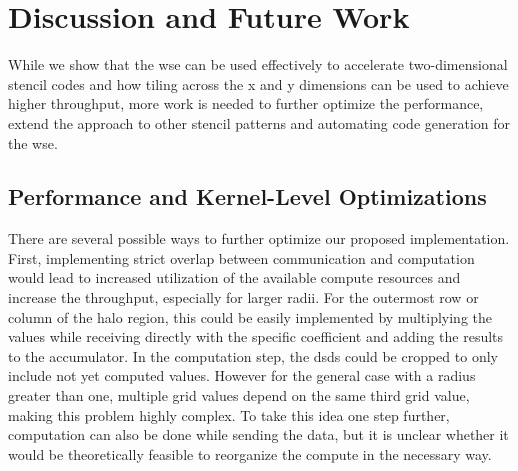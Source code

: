 \chapter{Discussion and Future Work}
While we show that the \ac{wse} can be used effectively to accelerate two-dimensional stencil codes and how tiling across the x and y dimensions can be used to achieve higher throughput, more work is needed to further optimize the performance, extend the approach to other stencil patterns and automating code generation for the \ac{wse}.

\section{Performance and Kernel-Level Optimizations}
There are several possible ways to further optimize our proposed implementation.
First, implementing strict overlap between communication and computation would lead to increased utilization of the available compute resources and increase the throughput, especially for larger radii.
For the outermost row or column of the halo region, this could be easily implemented by multiplying the values while receiving directly with the specific coefficient and adding the results to the accumulator. In the computation step, the \acp{dsd} could be cropped to only include not yet computed values. However for the general case with a radius greater than one, multiple grid values depend on the same third grid value, making this problem highly complex. To take this idea one step further, computation can also be done while sending the data, but it is unclear whether it would be theoretically feasible to reorganize the compute in the necessary way.

